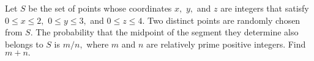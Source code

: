Let $S$ be the set of points whose coordinates $x,$ $y,$ and $z$ are integers that satisfy $0\le x\le2,$ $0\le y\le3,$ and $0\le z\le4.$  Two distinct points are randomly chosen from $S.$  The probability that the midpoint of the segment they determine also belongs to $S$ is $m/n,$ where $m$ and $n$ are relatively prime positive integers.  Find $m+n.$